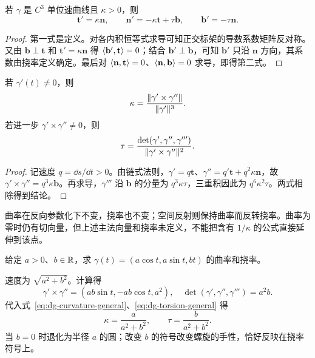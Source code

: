 \begin{theorem}
若 $\gamma$ 是 $C^3$ 单位速曲线且 $\kappa>0$，则
\begin{equation}
 \mathbf t'=\kappa\mathbf n,\qquad
 \mathbf n'=-\kappa\mathbf t+\tau\mathbf b,\qquad
 \mathbf b'=-\tau\mathbf n.
 \label{eq:dg-frenet}
\end{equation}
\end{theorem}
\begin{proof}
第一式是定义。对各内积恒等式求导可知正交标架的导数系数矩阵反对称。又由 $\mathbf b\perp\mathbf t$ 和 $\mathbf t'=\kappa\mathbf n$ 得 $\langle \mathbf b',\mathbf t\rangle=0$；结合 $\mathbf b'\perp\mathbf b$，可知 $\mathbf b'$ 只沿 $\mathbf n$ 方向，其系数由挠率定义确定。最后对 $\langle \mathbf n,\mathbf t\rangle=0$、$\langle \mathbf n,\mathbf b\rangle=0$ 求导，即得第二式。
\end{proof}

\begin{proposition}[一般参数公式]
若 $\gamma'(t)\ne0$，则
\begin{equation}
 \kappa=\frac{\lVert \gamma'\times\gamma''\rVert}{\lVert \gamma'\rVert^3}.
 \label{eq:dg-curvature-general}
\end{equation}
若进一步 $\gamma'\times\gamma''\ne0$，则
\begin{equation}
 \tau=\frac{\det(\gamma',\gamma'',\gamma''')}{\lVert \gamma'\times\gamma''\rVert^2}.
 \label{eq:dg-torsion-general}
\end{equation}
\end{proposition}
\begin{proof}
记速度 $q=\dd s/\dd t>0$。由链式法则，$\gamma'=q\mathbf t$、$\gamma''=q'\mathbf t+q^2\kappa\mathbf n$，故 $\gamma'\times\gamma''=q^3\kappa\mathbf b$。再求导，$\gamma'''$ 沿 $\mathbf b$ 的分量为 $q^3\kappa\tau$，三重积因此为 $q^6\kappa^2\tau$。两式相除得到结论。
\end{proof}
曲率在反向参数化下不变，挠率也不变；空间反射则保持曲率而反转挠率。曲率为零时仍有切向量，但上述主法向量和挠率未定义，不能把含有 $1/\kappa$ 的公式直接延伸到该点。

\begin{example}[圆柱螺线]\label{exam:dg-helix}
给定 $a>0$、$b\in\mathbb R$，求 $\gamma(t)=(a\cos t,a\sin t,bt)$ 的曲率和挠率。
\end{example}
\begin{solve}
速度为 $\sqrt{a^2+b^2}$。计算得
\[
 \gamma'\times\gamma''=(ab\sin t,-ab\cos t,a^2),\quad
 \det(\gamma',\gamma'',\gamma''')=a^2b.
\]
代入式~\eqref{eq:dg-curvature-general}、\eqref{eq:dg-torsion-general} 得
\[
 \kappa=\frac a{a^2+b^2},\qquad \tau=\frac b{a^2+b^2}.
\]
当 $b=0$ 时退化为半径 $a$ 的圆；改变 $b$ 的符号改变螺旋的手性，恰好反映在挠率符号上。
\end{solve}

